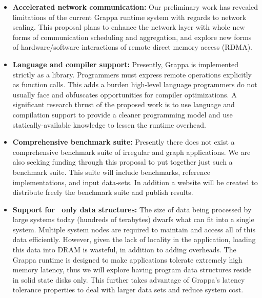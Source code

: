 \begin{itemize}

\item \textbf{Accelerated network communication:} Our preliminary work has
revealed limitations of the current Grappa runtime system with regards to
network scaling. This proposal plans to enhance the network layer with whole
new forms of communication scheduling and aggregation, and explore new forms
of hardware/software interactions of remote direct memory access (RDMA).

\item \textbf{Language and compiler support:} Presently, Grappa is implemented
strictly as a library. Programmers must express remote operations explicitly
as function calls. This adds a burden high-level language programmers do not
usually face and obfuscates opportunities for compiler optimizations. A
significant research thrust of the proposed work is to use language and
compilation support to provide a cleaner programming model and use
statically-available knowledge to lessen the runtime overhead.

\item \textbf{Comprehensive benchmark suite:} Presently there does not exist a
comprehensive benchmark suite of irregular and graph applications. We
are also seeking funding through this proposal to put together just
such a benchmark suite. This suite will include benchmarks, reference
implementations, and input data-sets. In addition a website will be
created to distribute freely the benchmark suite and publish results.

\item \textbf{Support for \ssd\ only data structures:} The size of data being
processed by large systems today (hundreds of terabytes) dwarfs what can fit
into a single system. Multiple system nodes are required to maintain and
access all of this data efficiently. However, given the lack of locality in the application, loading this data into DRAM is wasteful, in addition to adding overheads. The
Grappa runtime is designed to make applications tolerate extremely high memory
latency, thus we will explore having program data structures reside in solid state disks only. This further takes advantage of Grappa's latency tolerance properties to deal with larger data sets and reduce system cost.

\end{itemize}


